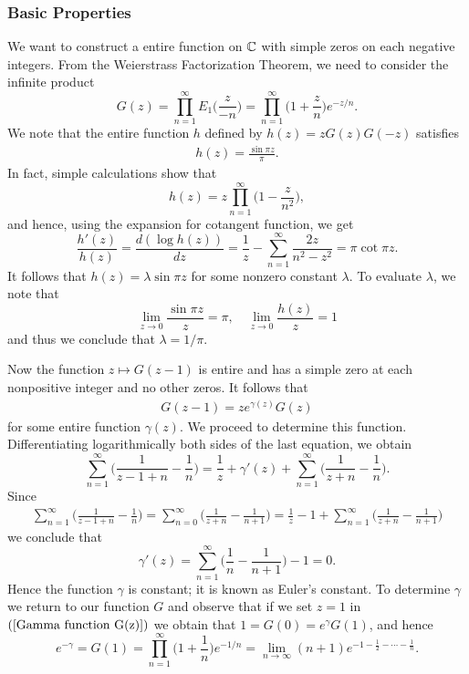\subsubsection{Basic Properties}
We want to construct a entire function on $\mathbb{C}$ with simple zeros on each negative integers. From the Weierstrass Factorization Theorem, we need to consider the infinite product
\[G(z)=\prod_{n=1}^{\infty}E_1\Big(\frac{z}{-n}\Big)=\prod_{n=1}^{\infty}\Big(1+\frac{z}{n}\Big)e^{-z/n}.\]
We note that the entire function $h$ defined by $h(z)=zG(z)G(-z)$ satisfies
\begin{align}\label{Gamma function h(z)}
h(z)=\frac{\sin\pi z}{\pi}.
\end{align}
In fact, simple calculations show that
\[h(z)=z\prod_{n=1}^{\infty}\Big(1-\frac{z}{n^2}\Big),\]
and hence, using the expansion for cotangent function, we get
\[\frac{h'(z)}{h(z)}=\frac{d(\log h(z))}{dz}=\frac{1}{z}-\sum_{n=1}^{\infty}\frac{2z}{n^2-z^2}=\pi\cot\pi z.\]
It follows that $h(z)=\lambda\sin\pi z$ for some nonzero constant $\lambda$. To evaluate $\lambda$, we note that
\[\lim_{z\to 0}\frac{\sin\pi z}{z}=\pi,\quad\lim_{z\to 0}\frac{h(z)}{z}=1\]
and thus we conclude that $\lambda=1/\pi$.\par
Now the function $z\mapsto G(z-1)$ is entire and has a simple zero at each nonpositive integer and no other zeros. It follows that
\begin{align}\label{Gamma function G(z)}
G(z-1)=ze^{\gamma(z)}G(z)
\end{align}
for some entire function $\gamma(z)$. We proceed to determine this function. Differentiating logarithmically both sides of the last equation, we obtain
\[\sum_{n=1}^{\infty}\Big(\frac{1}{z-1+n}-\frac{1}{n}\Big)=\frac{1}{z}+\gamma'(z)+\sum_{n=1}^{\infty}\Big(\frac{1}{z+n}-\frac{1}{n}\Big).\]
Since
\begin{align*}
\sum_{n=1}^{\infty}\Big(\frac{1}{z-1+n}-\frac{1}{n}\Big)=\sum_{n=0}^{\infty}\Big(\frac{1}{z+n}-\frac{1}{n+1}\Big)=\frac{1}{z}-1+\sum_{n=1}^{\infty}\Big(\frac{1}{z+n}-\frac{1}{n+1}\Big)
\end{align*}
we conclude that
\[\gamma'(z)=\sum_{n=1}^{\infty}\Big(\frac{1}{n}-\frac{1}{n+1}\Big)-1=0.\]
Hence the function $\gamma$ is constant; it is known as Euler's constant. To determine $\gamma$ we return to our function $G$ and observe that if we set $z=1$ in $(\ref{Gamma function G(z)})$ we obtain that $1=G(0)=e^{\gamma}G(1)$, and hence
\[e^{-\gamma}=G(1)=\prod_{n=1}^{\infty}\Big(1+\frac{1}{n}\Big)e^{-1/n}=\lim_{n\to\infty}(n+1)e^{-1-\frac{1}{2}-\cdots-\frac{1}{n}}.\]
